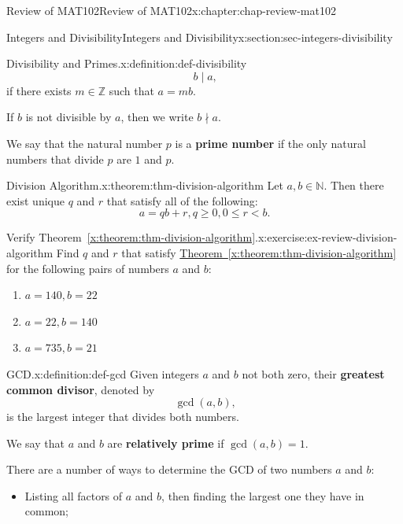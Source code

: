 \documentclass[oneside,10pt,]{book}
\newcommand{\xreffont}{\relax}
\newcommand{\terminology}[1]{\textbf{#1}}
\numberwithin{equation}{section}
\newcommand{\lt}{<}
\begin{document}
\begin{chapterptx}{Review of MAT102}{}{Review of MAT102}{}{}{x:chapter:chap-review-mat102}
\begin{sectionptx}{Integers and Divisibility}{}{Integers and Divisibility}{}{}{x:section:sec-integers-divisibility}
\begin{definition}{Divisibility and Primes.}{x:definition:def-divisibility}
\begin{equation*}
b \mid a\text{,}
\end{equation*}
if there exists \(m \in \mathbb{Z}\) such that \(a = mb\).%
\par
If \(b\) is not divisible by \(a\), then we write \(b \nmid a\).%
\par
We say that the natural number \(p\) is a \terminology{prime number} if the only natural numbers that divide \(p\) are \(1\) and \(p\).%
\end{definition}
\begin{theorem}{Division Algorithm.}{}{x:theorem:thm-division-algorithm}%
Let \(a,b \in \mathbb{N}\). Then there exist unique \(q\) and \(r\) that satisfy all of the following:%
\begin{equation*}
a = qb + r, q \geq 0, 0 \leq r \lt b\text{.}
\end{equation*}
%
\end{theorem}
\begin{inlineexercise}{Verify Theorem~{\xreffont\ref*{x:theorem:thm-division-algorithm}}.}{x:exercise:ex-review-division-algorithm}%
Find \(q\) and \(r\) that satisfy \hyperref[x:theorem:thm-division-algorithm]{Theorem~{\xreffont\ref{x:theorem:thm-division-algorithm}}} for the following pairs of numbers \(a\) and \(b\):%
\begin{enumerate}[label=(\alph*)]
\item{}\(\displaystyle a = 140, b = 22\)%
\item{}\(\displaystyle a = 22, b = 140\)%
\item{}\(\displaystyle a = 735, b = 21\)%
\end{enumerate}
%
\end{inlineexercise}%
\begin{definition}{GCD.}{x:definition:def-gcd}%
\label{g:notation:id522039} Given integers \(a\) and \(b\) not both zero, their \terminology{greatest common divisor}, denoted by%
\begin{equation*}
\gcd(a,b)\text{,}
\end{equation*}
is the largest integer that divides both numbers.%
\par
We say that \(a\) and \(b\) are \terminology{relatively prime} if \(\gcd(a,b) = 1\).%
\end{definition}
There are a number of ways to determine the GCD of two numbers \(a\) and \(b\):%
\begin{itemize}[label=\textbullet]
\item{}Listing all factors of \(a\) and \(b\), then finding the largest one they have in common;%

\end{itemize}
\end{sectionptx}
\end{chapterptx}
\end{document}
